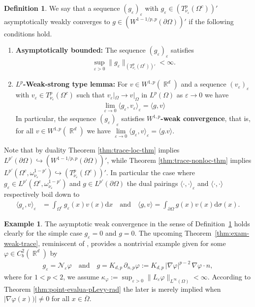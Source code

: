\documentclass[12pt, reqno]{amsart}%
\theoremstyle{plain}  %
\theoremstyle{definition}  %
\newtheorem{definition}[theorem]{Definition}
\newtheorem{example}[theorem]{Example}
\numberwithin{equation}{section}
\DeclareMathOperator{\R}{\mathbb{R}}
\renewcommand{\d}{\mathrm{d}}
\newcommand{\eps}{\varepsilon}
\newcommand{\TnuOma}{T^p_{\nu_\eps} (\Omega^c)}
\begin{document}
\begin{definition}\label{def:weak-asymp-trace}
We say that a sequence  $(g_\eps)_\eps$ with $g_\eps\in (T^p_{\nu_\eps}(\Omega^c))'$ asymptotically weakly converges to $g\in (W^{1-1/p , p}(\partial\Omega))'$ if
the following conditions hold.
\begin{enumerate}[$(G_1)$]
\item \textbf{Asymptotically bounded:} The sequence $(g_\eps)_\eps$ satisfies
\begin{align*}
\sup_{\eps>0} \| g_\eps\|_{(T^p_{\nu_\eps}(\Omega^c))'}<\infty .
\end{align*}

\item \textbf{$L^p$-Weak-strong type lemma:}
For $v\in W^{1,p}(\R^d)$  and a sequence $(v_\eps)_\eps$ with $v_\eps\in\TnuOma$  such that $v_\eps|_\Omega\to v|_\Omega$  in $L^p(\Omega)$  as $\eps\to 0$ we have
\begin{align*}
\lim_{\eps\to0} \langle g_\eps , v_\eps \rangle_\eps  = \langle g , v\rangle
\end{align*}
In particular, the sequence $(g_\eps)_\eps$  satisfies \textbf{$W^{1,p}$-weak convergence}, that is, for all $v\in W^{1,p}(\R^d)$ we have $\lim\limits_{\eps\to0} \langle g_\eps , v\rangle_\eps = \langle g.  v\rangle.$
\end{enumerate}
\end{definition}


\noindent Note that by duality Theorem \ref{thm:trace-loc-thm} implies $L^{p'}(\partial\Omega)\hookrightarrow (W^{1-1/p ,p}(\partial \Omega))'$, while Theorem \ref{thm:trace-nonloc-thm} implies $ L^{p'} (\Omega^c, \omega_{\nu_\eps}^{1-p'})\hookrightarrow (\TnuOma)'$.
In  particular the case where $g_\eps\in L^{p'} (\Omega^c, \omega_{\nu_\eps}^{1-p'})$ and
$g\in L^{p'}(\partial\Omega)$  the dual pairings $\langle \cdot,\cdot \rangle_\eps$ and $\langle \cdot,\cdot \rangle$  respectively boil down to
\begin{align*}
\langle g_\eps , v \rangle_\eps&= \int_{\Omega^c}g_\eps(x) v(x)\d x\quad\text{and}\quad
\langle g , v \rangle=\int_{\partial \Omega}g (x)v(x)\d \sigma(x).
\end{align*}

\begin{example}
The asymptotic weak convergence in the sense of Definition~\ref{def:weak-asymp-trace}
holds clearly for the simple case $g_\eps = 0$ and $g = 0$.
The upcoming Theorem~\ref{thm:exam-weak-trace}, reminiscent of
\cite[Lemma~11.1]{Fog25}, provides a nontrivial example given for some $\varphi \in C_b^2(\R^d)$ by
\begin{align*}
    g_\eps = \mathcal{N}_\eps \varphi
    \quad\text{and}\quad
    g = K_{d,p}\,\partial_{n,p}\varphi
      := K_{d,p}\,|\nabla \varphi|^{p-2}\,\nabla \varphi \cdot n,
\end{align*}
where for $1<p<2$, we assume $\kappa_\varphi :=
    \sup_{\eps>0} \|L_\eps \varphi\|_{L^\infty(\Omega)} < \infty.$ According to  Theorem \ref{thm:point-evalua-pLevy-rad} the later is merely implied when $|\nabla \varphi(x))|\neq 0$ for all $x\in \overline{\Omega}$.
\end{example}
\end{document}
